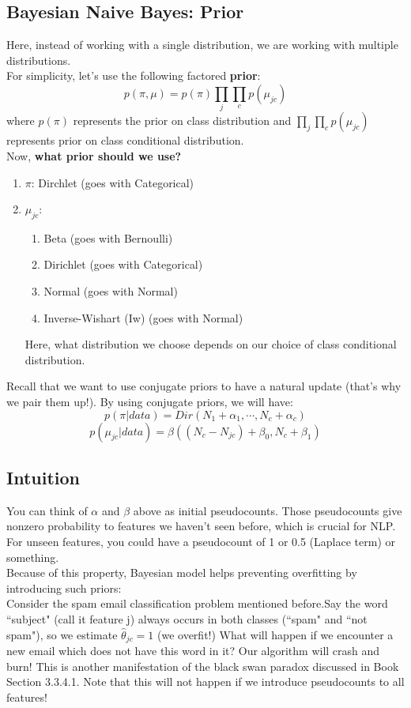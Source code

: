 \documentclass{article}
\begin{document}
\subsection{Bayesian Naive Bayes: Prior}
Here, instead of working with a single distribution, we are working with multiple distributions.\\
For simplicity, let's use the following factored \textbf{prior}: \\ 
\[p(\pi, \mu) = p(\pi) \prod_j \prod_c p(\mu_{jc})\] 
where $p(\pi)$ represents the prior on class distribution and $\prod_j \prod_c p(\mu_{jc})$ represents prior on class conditional distribution. \\
Now, \textbf{what prior should we use?}
\begin{enumerate}
    \item $\pi$: Dirchlet (goes with Categorical)
    \item $\mu_{jc}$: 
        \begin{enumerate}
            \item Beta (goes with Bernoulli)
            \item Dirichlet (goes with Categorical)
            \item Normal (goes with Normal)
            \item Inverse-Wishart (Iw) (goes with Normal)
        \end{enumerate}
        Here, what distribution we choose depends on our choice of class conditional distribution.
\end{enumerate} 
Recall that we want to use conjugate priors to have a natural update (that's why we pair them up!). By using conjugate priors, we will have: \\
    \[ p(\pi | data) = Dir(N_1 + \alpha_1, \cdots, N_c + \alpha_c) \]
    \[ p(\mu_{jc} | data) = \beta((N_c - N_{jc}) + \beta_0, N_c + \beta_1) \]
\subsection{Intuition}
You can think of $\alpha$ and $\beta$ above as initial pseudocounts. 
Those pseudocounts give nonzero probability to features we haven't seen before, which is crucial for NLP. For unseen features, you could have a pseudocount of 1 or 0.5 (Laplace term) or something.\\ 
Because of this property, Bayesian model helps preventing overfitting by introducing such priors:\\
Consider the spam email classification problem mentioned before.Say the word ``subject" (call it feature j) always occurs in both classes (``spam" and ``not spam"), so we estimate $\hat{\theta}_{jc} = 1$ (we overfit!) What will happen if we encounter a new email which does not have this word in it? Our algorithm will crash and burn! This is another manifestation of the black swan paradox discussed in Book Section 3.3.4.1. Note that this will not happen if we introduce pseudocounts to all features! 
\end{document}

